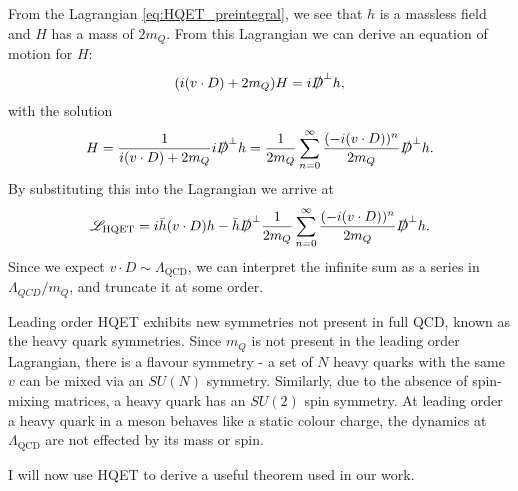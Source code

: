 From the Lagrangian \eqref{eq:HQET_preintegral}, we see that $h$ is a massless field and $H$ has a mass of $2m_Q$. From this Lagrangian we can derive an equation of motion for $H$:
\begin{align}
  ( i(v\cdot D) + 2m_Q) H = i\slashed{D}^{\perp} h,
\end{align}
with the solution
\begin{align}
  H = {1\over i(v\cdot D) + 2m_Q} i\slashed{D}^{\perp} h = {1\over 2m_Q}\sum_{n=0}^{\infty} {(-i(v\cdot D))^n\over 2m_Q} \slashed{D}^{\perp} h.
\end{align}
By substituting this into the Lagrangian we arrive at
\begin{align}
  \mathscr{L}_{\text{HQET}} = i \bar{h} (v\cdot D) h - \bar{h} \slashed{D}^{\perp} {1\over 2m_Q}\sum_{n=0}^{\infty} {(-i(v\cdot D))^n\over 2m_Q} \slashed{D}^{\perp} h.
  \label{eq:HQET_lagrangian}
\end{align}
Since we expect $v\cdot D \sim \Lambda_{\text{QCD}}$, we can interpret the infinite sum as a series in $\Lambda_{QCD}/m_Q$, and truncate it at some order. %

Leading order HQET exhibits new symmetries not present in full QCD, known as the heavy quark symmetries. Since $m_Q$ is not present in the leading order Lagrangian, there is a flavour symmetry - a set of $N$ heavy quarks with the same $v$ can be mixed via an $SU(N)$ symmetry. Similarly, due to the absence of spin-mixing matrices, a heavy quark has an $SU(2)$ spin symmetry. At leading order a heavy quark in a meson behaves like a static colour charge, the dynamics at $\Lambda_{\text{QCD}}$ are not effected by its mass or spin.

I will now use HQET to derive a useful theorem used in our work.


